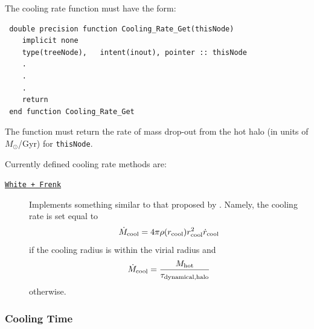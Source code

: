 The cooling rate function must have the form:
\begin{verbatim}
 double precision function Cooling_Rate_Get(thisNode)
    implicit none
    type(treeNode),   intent(inout), pointer :: thisNode
    .
    .
    .
    return
 end function Cooling_Rate_Get
\end{verbatim}
The function must return the rate of mass drop-out from the hot halo (in units of $M_\odot$/Gyr) for {\tt thisNode}. 

Currently defined cooling rate methods are:
\begin{description}
 \item [\hyperlink{cooling.cooling_rate.White-Frenk.F90:cooling_rates_white_frenk:cooling_rate_white_frenk}{{\tt White + Frenk}}] Implements something similar to that proposed by \cite{white_galaxy_1991}. Namely, the cooling rate is set equal to
 \begin{equation}
  \dot{M}_{\rm cool} = 4 \pi \rho(r_{\rm cool}) r_{\rm cool}^2 \dot{r}_{\rm cool}
 \end{equation}
 if the cooling radius is within the virial radius and
 \begin{equation}
  \dot{M}_{\rm cool} = {M_{\rm hot} \over \tau_{\rm dynamical,halo}}
 \end{equation}
 otherwise.
\end{description}

\subsubsection{Cooling Time}

